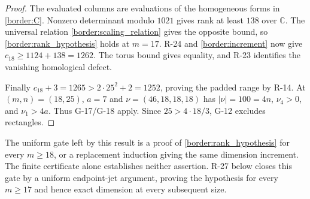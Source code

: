 \begin{proof}
The evaluated columns are evaluations of the homogeneous forms
in \eqref{border:C}. Nonzero determinant modulo $1021$ gives
rank at least $138$ over $\mathbb C$. The universal relation
\eqref{border:scaling_relation} gives the opposite bound, so
\eqref{border:rank_hypothesis} holds at $m=17$.
R-24 and \eqref{border:increment} now give
$c_{18}\geq1124+138=1262$. The torus bound gives equality, and
R-23 identifies the vanishing homological defect.

Finally $c_{18}+3=1265>2\cdot25^2+2=1252$, proving the padded
range by R-14. At $(m,n)=(18,25)$, $a=7$ and
$\nu=(46,18,18,18)$ has $|\nu|=100=4n$, $\nu_4>0$, and
$\nu_1>4a$. Thus G-17/G-18 apply. Since $25>4\cdot18/3$,
G-12 excludes rectangles.
\end{proof}

The uniform gate left by this result is a proof of
\eqref{border:rank_hypothesis} for every $m\geq18$, or a
replacement induction giving the same dimension increment.
The finite certificate alone establishes neither assertion.
R-27 below closes this gate by a uniform endpoint-jet argument,
proving the hypothesis for every $m\geq17$ and hence exact
dimension at every subsequent size.
